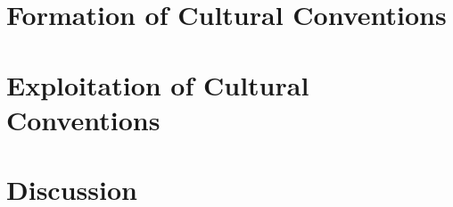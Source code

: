 \documentclass[a4paper,11pt,twoside,openany,final]{memoir} %
\begin{document}
\fontsize{10.5pt}{13.5pt}\selectfont %


\maketitle


\frontmatter

% 
\clearpage

\dominitoc
\tableofcontents





\printglossaries



\mainmatter




\part{Formation of Cultural Conventions}
\label{part:formation}





\part{Exploitation of Cultural Conventions}
\label{part:exploitation}




\part{Discussion}





\appendixpage
\appendix






\backmatter

\clearpage




\end{document}
